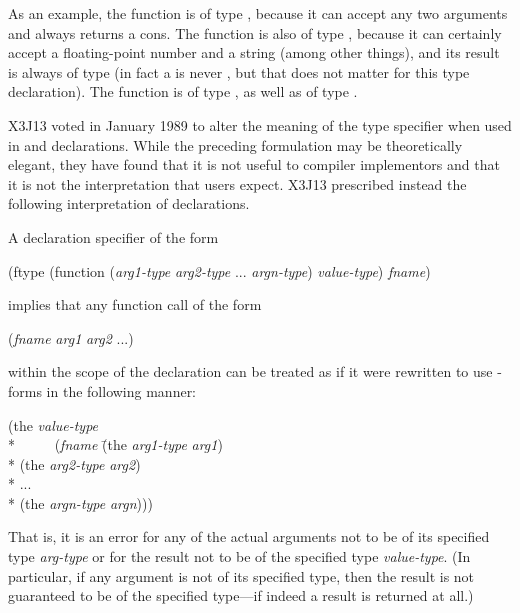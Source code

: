 \begin{flushdesc}
\begin{obsolete}
As an example, the function  is of type ,
because it can accept any two arguments and always returns a cons.
The function  is
also of type , because it can certainly
accept a floating-point number and a string (among other things), and its
result is always of type  (in fact a  is never ,
but that does not matter for this type declaration).
The function  is of type
, as well as of type
.
\end{obsolete}

\begin{new}
X3J13 voted in January 1989
to alter the meaning of the
 type specifier when used in  and 
declarations.  While the preceding formulation may be theoretically
elegant, they have found that it is not useful to compiler implementors
and that it is not the interpretation that users expect.  X3J13 prescribed instead the
following interpretation of declarations.

A declaration specifier of the form
\begin{lisp}
(ftype (function (\emph{arg1-type} \emph{arg2-type} ... \emph{argn-type}) \emph{value-type}) \emph{fname})
\end{lisp}
implies that any function call of the form
\begin{lisp}
(\emph{fname} \emph{arg1} \emph{arg2} ...)
\end{lisp}
within the scope of the declaration can be treated as if it were
rewritten to use -forms in the following manner:
\begin{lisp}
(the \emph{value-type} \\*
~~~~~(\emph{fname} \=(the \emph{arg1-type} \emph{arg1}) \\*
                  \>(the \emph{arg2-type} \emph{arg2}) \\*
                  \>... \\*
                  \>(the \emph{argn-type} \emph{argn})))
\end{lisp}
That is, it is an error for any of the actual arguments not to be of
its specified type \emph{arg-type} or for the result not to be of the specified
type \emph{value-type}.  (In particular, if any argument is not of
its specified type, then the result is not guaranteed to be of the
specified type---if indeed a result is returned at all.)


\end{new}
\end{flushdesc}
